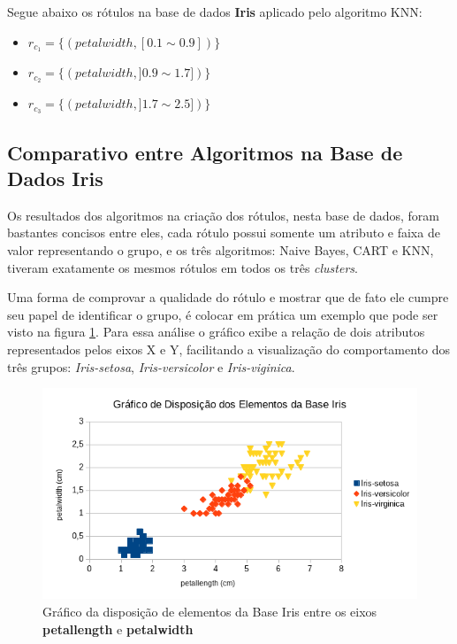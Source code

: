 Segue abaixo os rótulos na base de dados \textbf{Iris} aplicado pelo algoritmo KNN:
\begin{itemize}[noitemsep]
 \item ${r_{c_1}=\{ (petalwidth,[ 0.1 \sim 0.9 ] ) \} }$  
 \item ${r_{c_2}=\{ (petalwidth, ] 0.9 \sim 1.7]) \} }$
 \item ${r_{c_3}=\{ (petalwidth, ] 1.7 \sim 2.5 ]) \} }$
\end{itemize}

\subsection{Comparativo entre Algoritmos na Base de Dados Iris} \label{cap:resultados:ssec:compalgoritmos:iris}

Os resultados dos algoritmos na criação dos rótulos, nesta base de dados, foram bastantes concisos entre eles, cada rótulo possui somente um atributo e faixa de valor representando o grupo, e os três algoritmos: Naive Bayes, CART e KNN, tiveram exatamente os mesmos rótulos em todos os três \textit{clusters}.

 Uma forma de comprovar a qualidade do rótulo e mostrar que de fato ele cumpre seu papel de identificar o grupo, é colocar em prática um exemplo que pode ser visto na figura \ref{fig:grafico_iris_petalwidth_petallength_BrOf}. Para essa análise o gráfico exibe a relação de dois atributos representados pelos eixos X e Y, facilitando a visualização do comportamento dos três grupos: \textit{Iris-setosa}, \textit{Iris-versicolor} e \textit{Iris-viginica}.

\begin{figure}[h!]
        \centering
        \includegraphics[scale=0.9]{figs/grafico_iris_petalwidth_petallength_BrOf.png}
        \caption{Gráfico da disposição de elementos da Base Iris entre os eixos \textbf{petallength} e \textbf{petalwidth}} \label{fig:grafico_iris_petalwidth_petallength_BrOf}
\end{figure}

